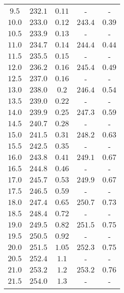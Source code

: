 \begin{table}
\begin{tabular}{c c c c c}
        $\num{9.5}$&$\num{232.1}$&$\num{0.11}$&-&-\\
        $\num{10.0}$&$\num{233.0}$&$\num{0.12}$&$\num{243.4}$&$\num{0.39}$\\
        $\num{10.5}$&$\num{233.9}$&$\num{0.13}$&-&-\\
        $\num{11.0}$&$\num{234.7}$&$\num{0.14}$&$\num{244.4}$&$\num{0.44}$\\
        $\num{11.5}$&$\num{235.5}$&$\num{0.15}$&-&-\\
        $\num{12.0}$&$\num{236.2}$&$\num{0.16}$&$\num{245.4}$&$\num{0.49}$\\
        $\num{12.5}$&$\num{237.0}$&$\num{0.16}$&-&-\\
        $\num{13.0}$&$\num{238.0}$&$\num{0.2}$&$\num{246.4}$&$\num{0.54}$\\
        $\num{13.5}$&$\num{239.0}$&$\num{0.22}$&-&-\\
        $\num{14.0}$&$\num{239.9}$&$\num{0.25}$&$\num{247.3}$&$\num{0.59}$\\
        $\num{14.5}$&$\num{240.7}$&$\num{0.28}$&-&-\\
        $\num{15.0}$&$\num{241.5}$&$\num{0.31}$&$\num{248.2}$&$\num{0.63}$\\
        $\num{15.5}$&$\num{242.5}$&$\num{0.35}$&-&-\\
        $\num{16.0}$&$\num{243.8}$&$\num{0.41}$&$\num{249.1}$&$\num{0.67}$\\
        $\num{16.5}$&$\num{244.8}$&$\num{0.46}$&-&-\\
        $\num{17.0}$&$\num{245.7}$&$\num{0.53}$&$\num{249.9}$&$\num{0.67}$\\
        $\num{17.5}$&$\num{246.5}$&$\num{0.59}$&-&-\\
        $\num{18.0}$&$\num{247.4}$&$\num{0.65}$&$\num{250.7}$&$\num{0.73}$\\
        $\num{18.5}$&$\num{248.4}$&$\num{0.72}$&-&-\\
        $\num{19.0}$&$\num{249.5}$&$\num{0.82}$&$\num{251.5}$&$\num{0.75}$\\
        $\num{19.5}$&$\num{250.5}$&$\num{0.92}$&-&-\\
        $\num{20.0}$&$\num{251.5}$&$\num{1.05}$&$\num{252.3}$&$\num{0.75}$\\
        $\num{20.5}$&$\num{252.4}$&$\num{1.1}$&-&-\\
        $\num{21.0}$&$\num{253.2}$&$\num{1.2}$&$\num{253.2}$&$\num{0.76}$\\
        $\num{21.5}$&$\num{254.0}$&$\num{1.3}$&-&-\\

\end{tabular}
\end{table}
